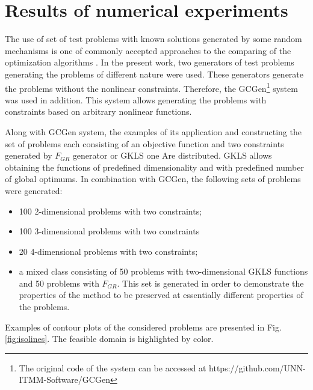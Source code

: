 \documentclass[runningheads]{llncs}
\begin{document}
\section{Results of numerical experiments}
\label{sec:exps}

The use of set of test problems with known solutions generated by some random mechanisms is
one of commonly accepted approaches to the comparing of the optimization algorithms
\cite{Beiranvand2017}.
In the present work, two generators of test problems generating the problems of different nature
\cite{grishaginClass, Gaviano2003} were used.
These generators generate the problems without the nonlinear constraints. Therefore, the
GCGen\footnote{The original code of the system can be accessed at https://github.com/UNN-
ITMM-Software/GCGen} \cite{GergelBarkalov2019} system was used in addition.
This system allows generating the problems with constraints based on arbitrary nonlinear
functions.

Along with GCGen system, the examples of its application and constructing the set of problems
each consisting of an objective function and two constraints generated by \(F_{GR}\)
\cite{grishaginClass} generator or GKLS \cite{Gaviano2003} one Are distributed.
GKLS \cite{Gaviano2003} allows obtaining the functions of predefined dimensionality and
with predefined number of global optimums.
In combination with GCGen, the following sets of problems were generated:
\begin{itemize}
  \item 100 2-dimensional problems with two constraints;
  \item 100 3-dimensional problems with two constraints
  \item 20 4-dimensional problems with two constraints;
  \item a mixed class consisting of 50 problems with
  two-dimensional GKLS functions and 50 problems with \(F_{GR}\).
  This set is generated in order to demonstrate the properties of the method to be preserved at essentially
  different properties of the problems.
\end{itemize}

Examples of contour plots of the considered problems are presented in Fig. \ref{fig:isolines}.
The feasible domain is highlighted by color.
\end{document}
